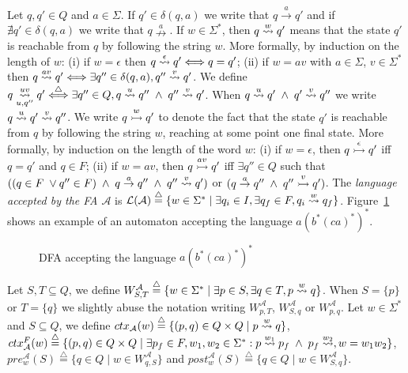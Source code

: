 Let $q,q' \in Q$ and $a \in \Sigma$.
If $q' \in \delta(q,a)$ we write that $q \overset{a}{\rightarrow} q'$ and
if $\nexists q' \in \delta(q,a)$ we write that $q \overset{a}{\nrightarrow}$.
If $w \in \Sigma^*$, then
$q \overset{w}{\rightsquigarrow} q'$ means that the state $q'$ is reachable from $q$ by following
the string $w$.
More formally, by induction on the length of $w$:
(i) if $w = \epsilon$ then $q \overset{\epsilon}{\rightsquigarrow} q' \Longleftrightarrow q = q'$;
(ii) if $w = av$ with $a \in \Sigma$,  $v \in \Sigma^*$ then
$q \overset{av}{\rightsquigarrow} q' \Longleftrightarrow \exists q'' \in \delta (q,a), q'' \overset{v}{\rightsquigarrow} q' $.
We define $q \underset{u,q''}{\overset{uv}{\rightsquigarrow}} q' \overset{\triangle}{\Longleftrightarrow} \exists q'' \in Q, q \overset{u}{\rightsquigarrow} q'' \; \wedge \; q'' \overset{v}{\rightsquigarrow} q'$.
When $q \overset{u}{\rightsquigarrow} q' \; \wedge \; q' \overset{v}{\rightsquigarrow} q''$ we write $q \overset{u}{\rightsquigarrow} q' \overset{v}{\rightsquigarrow} q''$.
We write $q \overset{w}{\rightarrowtail} q'$ to denote the fact that the
state $q'$ is reachable from $q$ by following the string $w$, reaching at some
point one final state.
More formally, by induction on the length of the word $w$:
(i) if $w = \epsilon$, then $q \overset{\epsilon}{\rightarrowtail} q'$ iff $q = q'$ and $q \in F$;
(ii) if $w = av$, then $q \overset{av}{\rightarrowtail} q'$ iff $\exists q'' \in Q$ such that
$((q \in F \; \vee q'' \in F) \; \wedge \; q \overset{a}{\rightarrow} q'' \; \wedge \; q'' \overset{v}{\rightsquigarrow} q')$
or $(q \overset{a}{\rightarrow} q'' \; \wedge \; q'' \overset{v}{\rightarrowtail} q')$.
The \emph{language accepted by the FA $\mathcal{A}$} is
$\mathcal{L}(\mathcal{A}) \overset{\triangle}{=} \{w \in \Sigma^* \; | \; \exists q_i \in I, \exists q_f \in F, q_i
\overset{w}{\rightsquigarrow} q_f\}$.
Figure~\ref{fig:DFA-example-2} shows an example of an automaton
accepting the language $a(b^*(ca)^*)^*$.

\begin{figure}[h]
\centering
{}
\caption{DFA accepting the language $a(b^*(ca)^*)^*$}
\label{fig:DFA-example-2}
\end{figure}

Let $S,T \subseteq Q$, we define $W_{S,T}^{\mathcal{A}} \overset{\triangle}{=} \{w \in \Sigma^* \; | \;
\exists p \in S, \exists q \in T, p \overset{w}{\rightsquigarrow} q \}$.
When $S = \{p\}$ or $T = \{q\}$ we slightly abuse the notation writing $W_{p,T}^{\mathcal{A}}$,
$W_{S,q}^{\mathcal{A}}$ or $W_{p,q}^{\mathcal{A}}$.
Let $w \in \Sigma^*$ and $S \subseteq Q$, we define $ctx_{\mathcal{A}}(w) \overset{\triangle}{=}
\{(p,q) \in Q \times Q \; | \; p \overset{w}{\rightsquigarrow} q \}$,
$ctx_{\mathcal{A}}^F(w) \overset{\triangle}{=} \{(p,q) \in Q \times Q \; | \; \exists p_f \in F,
w_1, w_2 \in \Sigma^*: p \overset{w_1}{\rightsquigarrow} p_f \; \wedge \; p_f \overset{w_2}{\rightsquigarrow}, w = w_1w_2 \}$,
$pre_w^{\mathcal{A}}(S) \overset{\triangle}{=} \{q \in Q \; | \; w \in W_{q, S}^{\mathcal{A}}\}$ and
$post_w^{\mathcal{A}}(S) \overset{\triangle}{=} \{q \in Q \; | \; w \in W_{S, q}^{\mathcal{A}}\}$.

